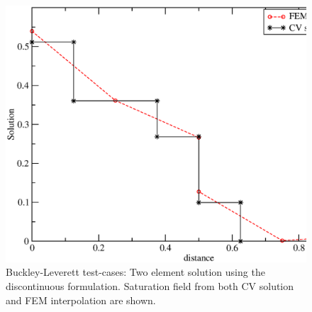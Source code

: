 \begin{figure}[h]
\begin{center}
\includegraphics[width=1.\textwidth]{bl-dg-2eles}
\end{center}
\caption{Buckley-Leverett test-cases: Two element solution using the discontinuous formulation. Saturation field from both CV solution and FEM interpolation are shown.  \label{bl-dg-2eles}}
\end{figure}


